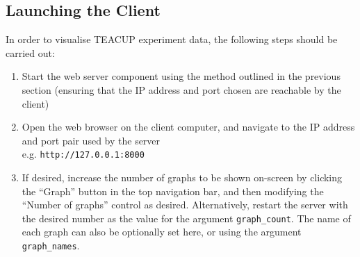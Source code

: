 \documentclass[a4paper,twocolumn,english,11pt, a4paper, conference]{IEEEtran}
\begin{document}
\subsection{Launching the Client}

In order to visualise TEACUP experiment data, the following steps should be carried out:

\begin{enumerate}
	\item Start the web server component using the method outlined in the previous section (ensuring that the IP address and port chosen are reachable by the client)
	\item Open the web browser on the client computer, and navigate to the IP address and port pair used by the server \\
		e.g. \texttt{http://127.0.0.1:8000}
	\item If desired, increase the number of graphs to be shown on-screen by clicking the ``Graph'' button in the top navigation bar, and then modifying the ``Number of graphs'' control as desired. Alternatively, restart the server with the desired number as the value for the argument \texttt{graph\_count}. The name of each graph can also be optionally set here, or using the argument \texttt{graph\_names}.
\end{enumerate}
	
\end{document}

